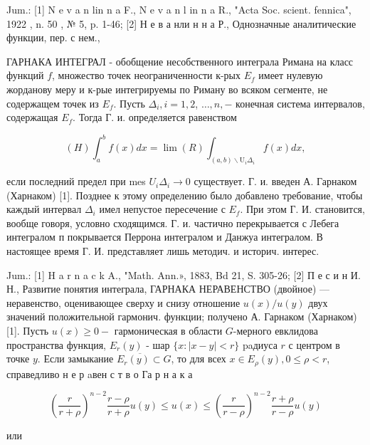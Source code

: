 \documentclass[10pt]{article}
\begin{document}
Jum.: [1] N e v a n lin n a F., N e v a n l in n a R., "Acta Soc. scient. fennica", 1922 , n. 50 , № 5, p. 1-46; [2] Н е в а нли н н а Р., Однозначные аналитические функции, пер. с нем.,



ГАРНАКА ИНТЕГРАЛ - обобщение несобственного интеграла Римана на класс функций $f$, множество точек неограниченности к-рых $E_{f}$ имеет нулевую жорданову меру и к-рые интегрируемы по Риману во всяком сегменте, не содержащем точек из $E_{f}$. Пусть $\Delta_{i}, i=1,2$, $\ldots, n,-$ конечная система интервалов, содержащая $E_{f}$. Тогда Г. и. определяется равенством



\[

(H) \int_{a}^{b} f(x) d x=\lim (R) \int_{(a, b) \backslash \mathrm{U}_{i} \Delta_{i}} f(x) d x,

\]



если последний предел при mes $U_{i} \Delta_{i} \rightarrow 0$ существует. Г. и. введен А. Гарнаком (Харнаком) [1]. Позднее к этому определению было добавлено требование, чтобы каждый интервал $\Delta_{i}$ имел непустое пересечение с $E_{f}$. При этом Г. И. становится, вообще говоря, условно сходящимся. Г. и. частично перекрывается с Лебега интегралом п покрывается Перрона интегралом и Данжуа интегралом. В настоящее время Г. И. представляет лишь методич. и историч. интерес.



Jum.: [1] H a r n a c k A., "Math. Ann.», 1883, Bd 21, S. 305-26; [2] П е с и н И. Н., Развитие понятия интеграла, ГАРНАКА НЕРАВЕНСТВО (двойное) — неравенство, оценивающее сверху и снизу отношение $u(x) / u(y)$ двух значений положительной гармонич. функции; получено А. Гарнаком (Харнаком) [1]. Пусть $u(x) \geqslant 0-$ гармоническая в области $G$-мерного евклидова пространства функция, $E_{r}(y)$ - шар $\{x:|x-y|<r\}$ paдиуса $r$ с центром в точке $y$. Если замыкание $\overline{E_{r}(y) \subset} G$, то для всех $x \in E_{\rho}(y), 0 \leqslant \rho<r$, справедливо н е р aвен с т в о Га р н а к а



\[

\left(\frac{r}{r+\rho}\right)^{n-2} \frac{r-\rho}{r+\rho} u(y) \leqslant u(x) \leqslant\left(\frac{r}{r-\rho}\right)^{n-2} \frac{r+\rho}{r-\rho} u(y)

\]



или
\end{document}
